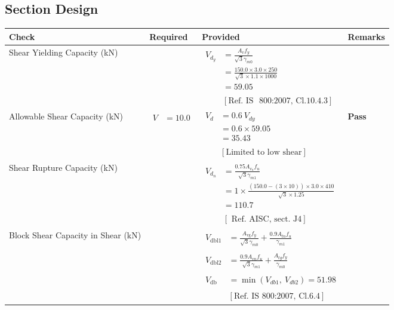 \documentclass{article}%
\begin{document}
%
%
\subsection{Section Design}%
\label{subsec:SectionDesign}%
\renewcommand{\arraystretch}{1.2}%
\begin{longtable}{|p{3.5cm}|p{5cm}|p{6cm}|p{1.5cm}|}%
\hline%
\rowcolor{OsdagGreen}%
Check&Required&Provided&Remarks\\%
\hline%
\endhead%
\hline%
Shear Yielding Capacity (kN)&&$\begin{aligned} V_{d_y} &= \frac{A_vf_y}{\sqrt{3}\gamma_{m0}}\\ &=\frac{150.0\times3.0\times250}{\sqrt{3} \times1.1 \times 1000}\\ &=59.05 \\ \\ & [\text{Ref. IS ~800:2007,~Cl.10.4.3}] \end{aligned}$&\textcolor{OsdagGreen}{ 
\textbf{}
}\\%
\hline%
Allowable Shear Capacity (kN)&$\begin{aligned} V &=10.0 \end{aligned}$&$\begin{aligned} V_{d} &= 0.6~V_{dy}\\ &=0.6 \times59.05\\ &=35.43\\ \\ & [\text{Limited to low shear}] \end{aligned}$&\textcolor{OsdagGreen}{ 
\textbf{Pass}
}\\%
\hline%
Shear Rupture Capacity (kN)&&$\begin{aligned} V_{d_n} &= \frac{0.75 A_{v_n} f_u}{\sqrt{3} \gamma_{m1}}\\ &=1\times \frac{(150.0-(3\times10))\times3.0\times410}{\sqrt{3}\times1.25}\\ &=110.7\\ \\ & [\text{ Ref. AISC, sect. J4}] \end{aligned}$&\textcolor{OsdagGreen}{ 
\textbf{}
}\\%
\hline%
Block Shear Capacity in Shear (kN)&&$\begin{aligned}V_{\text{dbl1}} &= \frac{A_{\text{vg}} f_{y}}{\sqrt{3} \gamma_{m0}} + \frac{0.9 A_{tn} f_{u}}{\gamma_{m1}}\\ \\ V_{\text{dbl2}} &= \frac{0.9A_{vn} f_{u}}{\sqrt{3} \gamma_{m1}} + \frac{A_{tg} f_{y}}{\gamma_{m0}}\\ \\ V_{\text{db}} &= \min(V_{db1},~ V_{db2})= 51.98\\ \\ & [\text{Ref. IS 800:2007, Cl.6.4}] \end{aligned}$&\textcolor{OsdagGreen}{ 
}
\end{longtable}
\end{document}
